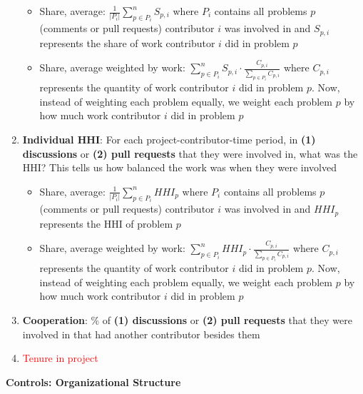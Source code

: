 \documentclass[source/paper/main.tex]{subfiles}
\begin{document}
\begin{enumerate}
    \begin{itemize}
        \item Share, average: $\frac{1}{|P_i|} \sum_{p \in P_i}^n S_{p, i} $ where $P_i$ contains all problems $p$ (comments or pull requests) contributor $i$ was involved in and $S_{p, i}$ represents the share of work contributor $i$ did in problem $p$ 
        \item Share, average weighted by work: $\sum_{p \in P_i}^n S_{p, i} \cdot \frac{C_{p,i}}{\sum_{p \in P_i} C_{p,i}}$ where $C_{p, i}$ represents the quantity of work contributor $i$ did in problem $p$. Now, instead of weighting each problem equally, we weight each problem $p$ by how much work contributor $i$ did in problem $p$ 
    \end{itemize}
    \item \textbf{Individual HHI}: For each project-contributor-time period, in \textbf{(1) discussions} or \textbf{(2) pull requests} that they were involved in, what was the HHI? This tells us how balanced the work was when they were involved
    \begin{itemize}
        \item Share, average: $\frac{1}{|P_i|} \sum_{p \in P_i}^n HHI_{p} $ where $P_i$ contains all problems $p$ (comments or pull requests) contributor $i$ was involved in and $HHI_{p}$ represents the HHI of problem $p$ 
        \item Share, average weighted by work: $\sum_{p \in P_i}^n HHI_{p} \cdot \frac{C_{p,i}}{\sum_{p \in P_i} C_{p,i}}$ where $C_{p, i}$ represents the quantity of work contributor $i$ did in problem $p$. Now, instead of weighting each problem equally, we weight each problem $p$ by how much work contributor $i$ did in problem $p$ 
    \end{itemize}
    \item \textbf{Cooperation}: \% of \textbf{(1) discussions} or \textbf{(2) pull requests} that they were involved in that had another contributor besides them
    \item \textcolor{red}{Tenure in project}
\end{enumerate}
\textbf{Controls: Organizational Structure}
\end{document}
